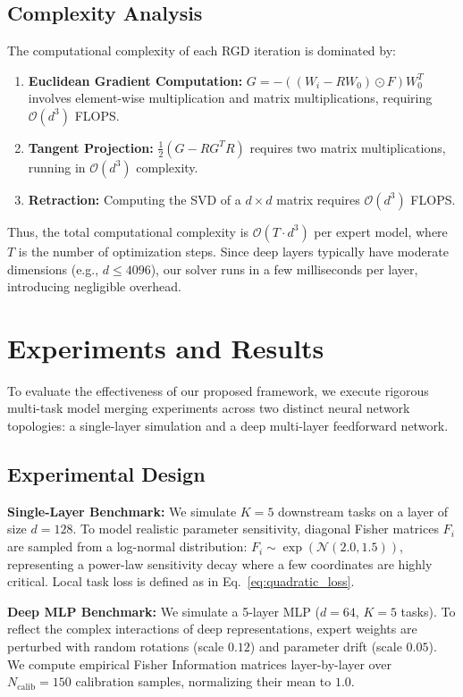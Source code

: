 \documentclass{article}
\theoremstyle{plain}
\theoremstyle{definition}
\theoremstyle{remark}
\begin{document}
\subsection{Complexity Analysis}
The computational complexity of each RGD iteration is dominated by:
\begin{enumerate}
    \item \textbf{Euclidean Gradient Computation:} $G = -((W_i - R W_0) \odot F) W_0^T$ involves element-wise multiplication and matrix multiplications, requiring $\mathcal{O}(d^3)$ FLOPS.
    \item \textbf{Tangent Projection:} $\frac{1}{2}(G - R G^T R)$ requires two matrix multiplications, running in $\mathcal{O}(d^3)$ complexity.
    \item \textbf{Retraction:} Computing the SVD of a $d \times d$ matrix requires $\mathcal{O}(d^3)$ FLOPS.
\end{enumerate}
Thus, the total computational complexity is $\mathcal{O}(T \cdot d^3)$ per expert model, where $T$ is the number of optimization steps. Since deep layers typically have moderate dimensions (e.g., $d \le 4096$), our solver runs in a few milliseconds per layer, introducing negligible overhead.

\section{Experiments and Results}
\label{sec:experiments}

To evaluate the effectiveness of our proposed framework, we execute rigorous multi-task model merging experiments across two distinct neural network topologies: a single-layer simulation and a deep multi-layer feedforward network.

\subsection{Experimental Design}
\textbf{Single-Layer Benchmark:} We simulate $K=5$ downstream tasks on a layer of size $d=128$. To model realistic parameter sensitivity, diagonal Fisher matrices $F_i$ are sampled from a log-normal distribution: $F_i \sim \exp(\mathcal{N}(2.0, 1.5))$, representing a power-law sensitivity decay where a few coordinates are highly critical. Local task loss is defined as in Eq.~\eqref{eq:quadratic_loss}.

\textbf{Deep MLP Benchmark:} We simulate a 5-layer MLP ($d=64$, $K=5$ tasks). To reflect the complex interactions of deep representations, expert weights are perturbed with random rotations (scale $0.12$) and parameter drift (scale $0.05$). We compute empirical Fisher Information matrices layer-by-layer over $N_{\text{calib}}=150$ calibration samples, normalizing their mean to $1.0$.
\end{document}
